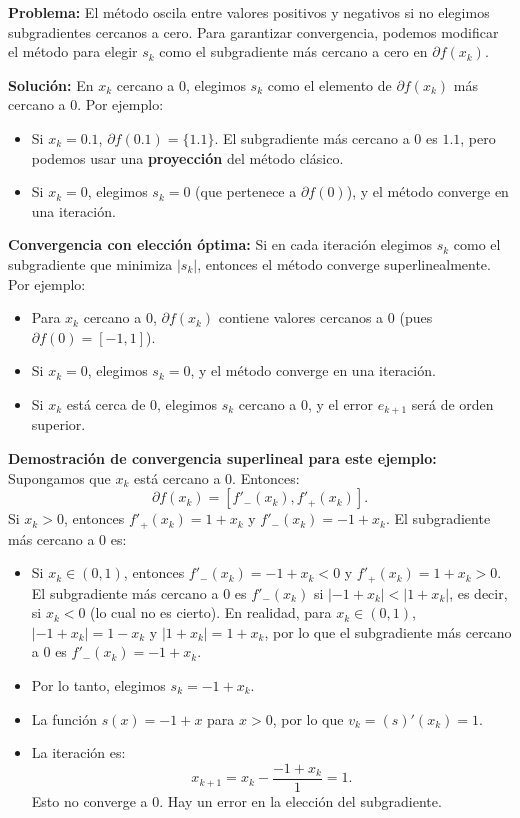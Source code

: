 \documentclass[12pt]{book}
\theoremstyle{definition}
\theoremstyle{plain}
\theoremstyle{remark}
\begin{document}
\medskip
\textbf{Problema:} El método oscila entre valores positivos y negativos si no elegimos subgradientes cercanos a cero. Para garantizar convergencia, podemos modificar el método para elegir \( s_k \) como el subgradiente más cercano a cero en \( \partial f(x_k) \).

\medskip
\textbf{Solución:} En \( x_k \) cercano a \( 0 \), elegimos \( s_k \) como el elemento de \( \partial f(x_k) \) más cercano a \( 0 \). Por ejemplo:
\begin{itemize}
    \item Si \( x_k = 0.1 \), \( \partial f(0.1) = \{1.1\} \). El subgradiente más cercano a \( 0 \) es \( 1.1 \), pero podemos usar una \textbf{proyección} del método clásico.
    \item Si \( x_k = 0 \), elegimos \( s_k = 0 \) (que pertenece a \( \partial f(0) \)), y el método converge en una iteración.
\end{itemize}

\medskip
\textbf{Convergencia con elección óptima:}
Si en cada iteración elegimos \( s_k \) como el subgradiente que minimiza \( |s_k| \), entonces el método converge superlinealmente. Por ejemplo:
\begin{itemize}
    \item Para \( x_k \) cercano a \( 0 \), \( \partial f(x_k) \) contiene valores cercanos a \( 0 \) (pues \( \partial f(0) = [-1, 1] \)).
    \item Si \( x_k = 0 \), elegimos \( s_k = 0 \), y el método converge en una iteración.
    \item Si \( x_k \) está cerca de \( 0 \), elegimos \( s_k \) cercano a \( 0 \), y el error \( e_{k+1} \) será de orden superior.
\end{itemize}

\medskip
\textbf{Demostración de convergencia superlineal para este ejemplo:}
Supongamos que \( x_k \) está cercano a \( 0 \). Entonces:
\[
\partial f(x_k) = [f'_-(x_k), f'_+(x_k)].
\]
Si \( x_k > 0 \), entonces \( f'_+(x_k) = 1 + x_k \) y \( f'_-(x_k) = -1 + x_k \). El subgradiente más cercano a \( 0 \) es:
\begin{itemize}
    \item Si \( x_k \in (0, 1) \), entonces \( f'_-(x_k) = -1 + x_k < 0 \) y \( f'_+(x_k) = 1 + x_k > 0 \). El subgradiente más cercano a \( 0 \) es \( f'_-(x_k) \) si \( |-1 + x_k| < |1 + x_k| \), es decir, si \( x_k < 0 \) (lo cual no es cierto). En realidad, para \( x_k \in (0, 1) \), \( |-1 + x_k| = 1 - x_k \) y \( |1 + x_k| = 1 + x_k \), por lo que el subgradiente más cercano a \( 0 \) es \( f'_-(x_k) = -1 + x_k \).

    \item Por lo tanto, elegimos \( s_k = -1 + x_k \).
    \item La función \( s(x) = -1 + x \) para \( x > 0 \), por lo que \( v_k = (s)' (x_k) = 1 \).
    \item La iteración es:
      \[
      x_{k+1} = x_k - \frac{-1 + x_k}{1} = 1.
      \]
      Esto no converge a \( 0 \). Hay un error en la elección del subgradiente.
\end{itemize}
\end{document}
